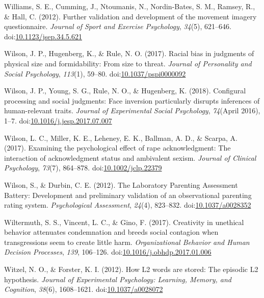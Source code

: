 \documentclass[english,man]{apa6}
\begin{document}
\hypertarget{ref-Williams2012}{}
Williams, S. E., Cumming, J., Ntoumanis, N., Nordin-Bates, S. M.,
Ramsey, R., \& Hall, C. (2012). Further validation and development of
the movement imagery questionnaire. \emph{Journal of Sport and Exercise
Psychology}, \emph{34}(5), 621--646.
doi:\href{https://doi.org/10.1123/jsep.34.5.621}{10.1123/jsep.34.5.621}

\hypertarget{ref-Wilson2017a}{}
Wilson, J. P., Hugenberg, K., \& Rule, N. O. (2017). Racial bias in
judgments of physical size and formidability: From size to threat.
\emph{Journal of Personality and Social Psychology}, \emph{113}(1),
59--80.
doi:\href{https://doi.org/10.1037/pspi0000092}{10.1037/pspi0000092}

\hypertarget{ref-Wilson2018}{}
Wilson, J. P., Young, S. G., Rule, N. O., \& Hugenberg, K. (2018).
Configural processing and social judgments: Face inversion particularly
disrupts inferences of human-relevant traits. \emph{Journal of
Experimental Social Psychology}, \emph{74}(April 2016), 1--7.
doi:\href{https://doi.org/10.1016/j.jesp.2017.07.007}{10.1016/j.jesp.2017.07.007}

\hypertarget{ref-Wilson2017}{}
Wilson, L. C., Miller, K. E., Leheney, E. K., Ballman, A. D., \& Scarpa,
A. (2017). Examining the psychological effect of rape acknowledgment:
The interaction of acknowledgment status and ambivalent sexism.
\emph{Journal of Clinical Psychology}, \emph{73}(7), 864--878.
doi:\href{https://doi.org/10.1002/jclp.22379}{10.1002/jclp.22379}

\hypertarget{ref-Wilson2012}{}
Wilson, S., \& Durbin, C. E. (2012). The Laboratory Parenting Assessment
Battery: Development and preliminary validation of an observational
parenting rating system. \emph{Psychological Assessment}, \emph{24}(4),
823--832. doi:\href{https://doi.org/10.1037/a0028352}{10.1037/a0028352}

\hypertarget{ref-Wiltermuth2017}{}
Wiltermuth, S. S., Vincent, L. C., \& Gino, F. (2017). Creativity in
unethical behavior attenuates condemnation and breeds social contagion
when transgressions seem to create little harm. \emph{Organizational
Behavior and Human Decision Processes}, \emph{139}, 106--126.
doi:\href{https://doi.org/10.1016/j.obhdp.2017.01.006}{10.1016/j.obhdp.2017.01.006}

\hypertarget{ref-Witzel2012}{}
Witzel, N. O., \& Forster, K. I. (2012). How L2 words are stored: The
episodic L2 hypothesis. \emph{Journal of Experimental Psychology:
Learning, Memory, and Cognition}, \emph{38}(6), 1608--1621.
doi:\href{https://doi.org/10.1037/a0028072}{10.1037/a0028072}
\end{document}
